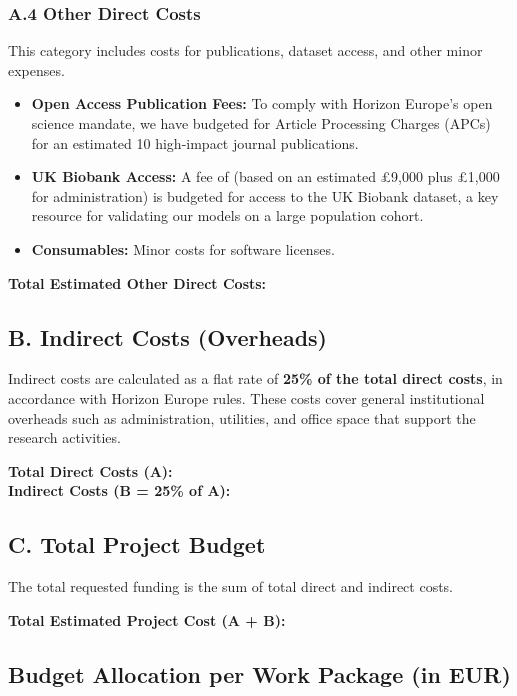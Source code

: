 \subsubsection*{A.4 Other Direct Costs}
This category includes costs for publications, dataset access, and other minor expenses.
\begin{itemize}
    \item \textbf{Open Access Publication Fees:} To comply with Horizon Europe's open science mandate, we have budgeted for Article Processing Charges (APCs) for an estimated 10 high-impact journal publications.
    \item \textbf{UK Biobank Access:} A fee of  (based on an estimated £9,000 plus £1,000 for administration) is budgeted for access to the UK Biobank dataset, a key resource for validating our models on a large population cohort.
    \item \textbf{Consumables:} Minor costs for software licenses.
\end{itemize}

\textbf{Total Estimated Other Direct Costs: }

\subsection*{B. Indirect Costs (Overheads)}
Indirect costs are calculated as a flat rate of \textbf{25\% of the total direct costs}, in accordance with Horizon Europe rules. These costs cover general institutional overheads such as administration, utilities, and office space that support the research activities.

\textbf{Total Direct Costs (A): } \\
\textbf{Indirect Costs (B = 25\% of A): }

\subsection*{C. Total Project Budget}
The total requested funding is the sum of total direct and indirect costs.

\textbf{Total Estimated Project Cost (A + B): }

\subsection*{Budget Allocation per Work Package (in EUR)}

